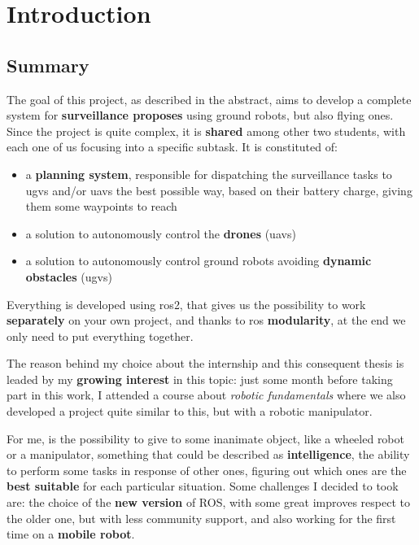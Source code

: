 \chapter{Introduction} %
\label{cha:intro}

\section{Summary}

The goal of this project, as described in the abstract, aims to develop a complete system for \textbf{surveillance proposes} using ground robots, but also flying ones.
Since the project is quite complex, it is \textbf{shared} among other two students, with each one of us focusing into a specific subtask. It is constituted of: 

\begin{itemize}
  \item a \textbf{planning system}, responsible for dispatching the surveillance tasks to \acrfull{ugvs} and/or \acrfull{uavs} the best possible way, based on their battery charge, giving them some waypoints to reach 
  \item a solution to autonomously control the \textbf{drones} (\acrshort{uavs})
  \item a solution to autonomously control ground robots avoiding \textbf{dynamic obstacles} (\acrshort{ugvs})
\end{itemize}

Everything is developed using \acrshort{ros}2, that gives us the possibility to work \textbf{separately} on your own project, and thanks to \acrshort{ros} \textbf{modularity}, at the end we only need to put everything together.

The reason behind my choice about the internship and this consequent thesis is leaded by my \textbf{growing interest} in this topic: just some month before taking part in this work, I attended a course about \textit{robotic fundamentals}\cite{intro2robotics} where we also developed a project quite similar to this, but with a robotic manipulator.

For me, is the possibility to give to some inanimate object, like a wheeled robot or a manipulator, something that could be described as \textbf{intelligence}, the ability to perform some tasks in response of other ones, figuring out which ones are the \textbf{best suitable} for each particular situation. Some challenges I decided to took are: the choice of the \textbf{new version} of ROS, with some great improves respect to the older one, but with less community support, and also working for the first time on a \textbf{mobile robot}.

